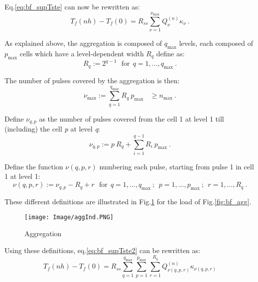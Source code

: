 \documentclass[a4paper,oneside,11pt]{report}
\begin{document}
{Eq.\ref{eq:bf_supTste} can now be rewritten as:
\begin{equation} \label{eq:bf_supTste2}
  T_f(n h) - T_f(0) = R_{ss} \sum_{\nu=1}^{\nu_{\text{max}} } Q_{\nu}^{(n)} \kappa_{\nu} \ .
\end{equation}

As explained above, the aggregation is composed of $q_{\text{max}}$ levels, each composed of $p_{\text{max}}$ cells which have a level-dependent width $R_q$ define as:
\begin{equation}
  R_{q} := 2^{q-1} \ \ \ \text{for} \ \ q = 1, ... , q_{\text{max}} \ .
\end{equation}

The number of pulses covered by the aggregation is then:
\begin{equation} \label{eq:bf_v_max}
  \nu_{\text{max}} := \sum_{q=1}^{q_{\text{max}} } R_q \ p_{\text{max}} \ \ \ \ \geq n_{\text{max}} \ .
\end{equation}

Define $\nu_{q,p}$ as the number of pulses covered from the cell 1 at level 1 till (including) the cell \textit{p} at level \textit{q}:
\begin{equation} \label{eq:bf_v_qp}
  \nu_{q,p} := p \ R_q + \sum_{i=1}^{q-1} R_i \ p_{\text{max}} \ .
\end{equation}

Define the function $\nu(q,p,r)$ numbering each pulse, starting from pulse 1 in cell 1 at level 1:
\begin{equation} \label{eq:bf_v_qpr}
  \nu(q,p,r) := \nu_{q,p} - R_q + r \ \ \ \text{for} \ \ q=1, \ldots , q_{\text{max}} \ ; \ \ p=1, \ldots , p_{\text{max}} \ ; \ \ r=1, \ldots , R_q \ .
\end{equation}

These different definitions are illustrated in Fig.\ref{fig:bf_aggInd} for the load of Fig.\ref{fig:bf_agg}.
\begin{figure}[hbtp]
\centering
\texttt{[image: Image/aggInd.PNG]}
\caption{Aggregation}
\label{fig:bf_aggInd}
\end{figure}

Using these definitions, eq.\ref{eq:bf_supTste2} can be rewritten as:
\begin{equation} \label{eq:bf_supTste3}
  T_f(n h) - T_f(0) = R_{ss} \sum_{q=1}^{ q_{\text{max}} } \sum_{p=1}^{p_{\text{max}}} \sum_{r=1}^{R_q} Q_{\nu(q,p,r)}^{(n)} \kappa_{\nu(q,p,r)}
\end{equation}

}
\end{document}
